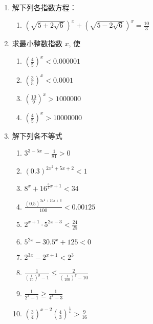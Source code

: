 \begin{enumerate}
\item  解下列各指数方程：
\begin{enumerate}
\item   $\left(\sqrt{5+2 \sqrt{6}}\right)^{x}+\left(\sqrt{5-2 \sqrt{6}}\right)^{x}=\frac{10}{3}$
\end{enumerate}


\item  求最小整数指数 $x$, 使
\begin{multicols}{2}
  \begin{enumerate}
    \item  $\left(\frac{4}{5}\right)^{x}<0.000001$
  \item  $\left(\frac{3}{5}\right)^{x}<0.0001$
    \item $\left(\frac{10}{9}\right)^{x}>1000000$
    \item $\left(\frac{4}{5}\right)^{x}>10000000$
  \end{enumerate}
\end{multicols}

\item  解下列各不等式
\begin{multicols}{2}
\begin{enumerate}
 \item  $3^{3-5 x}-\frac{1}{81}>0$
\item  $(0.3)^{2 x^{2}+5 x+2}<1$
\item  $8^{x}+16^{\tfrac{3}{4} x+1}<34$
\item  $\frac{(0.5)^{3 x^{2}+10 x+6}}{100}<0.00125$
\item  $2^{x+1} \cdot 5^{2 x-3}<\frac{24}{25}$
\item  $5^{2x}-30.5^{x}+125<0$
\item  $2^{3 x}-2^{x+1}<2^{3} $
\item  $\frac{1}{\left(\frac{1}{10}\right)^{y}-1} \leqslant \frac{2}{\left(\frac{1}{100}\right)^{y}-10}$
\item  $\frac{1}{2^{x}-1} \geqslant \frac{1}{4^{x}-3}$
\item  $\left(\frac{3}{4}\right)^{x-2}\left(\frac{4}{3}\right)^{\tfrac{1}{x}}>\frac{9}{16}$
\end{enumerate}
\end{multicols}



\end{enumerate}
